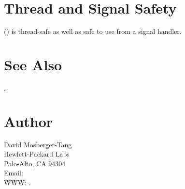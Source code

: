 \documentclass{article}
\begin{document}
\section{Thread and Signal Safety}

() is thread-safe as well as safe to use
from a signal handler.

\section{See Also}

,

\section{Author}

\noindent
David Mosberger-Tang\\
Hewlett-Packard Labs\\
Palo-Alto, CA 94304\\
Email: \\
WWW: .
\LatexManEnd
\end{document}
